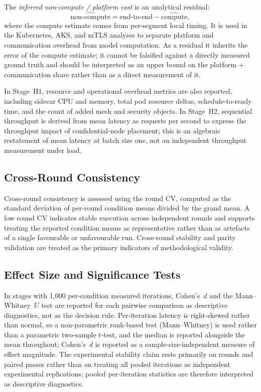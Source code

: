 The \emph{inferred non-compute / platform cost} is an analytical residual:
\[
\widehat{\mathrm{non\text{-}compute}} = \mathrm{end\text{-}to\text{-}end} - \widehat{\mathrm{compute}},
\]
where the compute estimate comes from per-segment local timing. It is used in the
Kubernetes, AKS, and mTLS analyses to separate platform and communication overhead from
model computation. As a residual it inherits the error of the compute estimate; it
cannot be falsified against a directly measured ground truth and should be interpreted
as an upper bound on the platform + communication share rather than as a direct
measurement of it.

In Stage~H1, resource and operational overhead metrics are also reported, including sidecar
CPU and memory, total pod resource deltas, schedule-to-ready time, and the count of
added mesh and security objects.
In Stage~H2, sequential throughput is derived from mean latency as requests per second to
express the throughput impact of confidential-node placement; this is an algebraic
restatement of mean latency at batch size one, not an independent throughput
measurement under load.

\subsection{Cross-Round Consistency}

Cross-round consistency is assessed using the round CV, computed as the standard
deviation of per-round condition means divided by the grand mean.
A low round CV indicates stable execution across independent rounds and supports
treating the reported condition means as representative rather than as artefacts of a
single favourable or unfavourable run.
Cross-round stability and parity validation are treated as the primary indicators of
methodological validity.

\subsection{Effect Size and Significance Tests}

In stages with 1{,}000 per-condition measured iterations, Cohen's~$d$ and the
Mann--Whitney~$U$ test are reported for each pairwise comparison as descriptive
diagnostics, not as the decision rule. Per-iteration latency is right-skewed rather than
normal, so a non-parametric rank-based test (Mann--Whitney) is used rather than a
parametric two-sample $t$-test, and the median is reported alongside the mean throughout;
Cohen's~$d$ is reported as a sample-size-independent measure of effect magnitude.
The experimental stability claim rests primarily on rounds and paired passes rather than
on treating all pooled iterations as independent experimental replications; pooled
per-iteration statistics are therefore interpreted as descriptive diagnostics.

